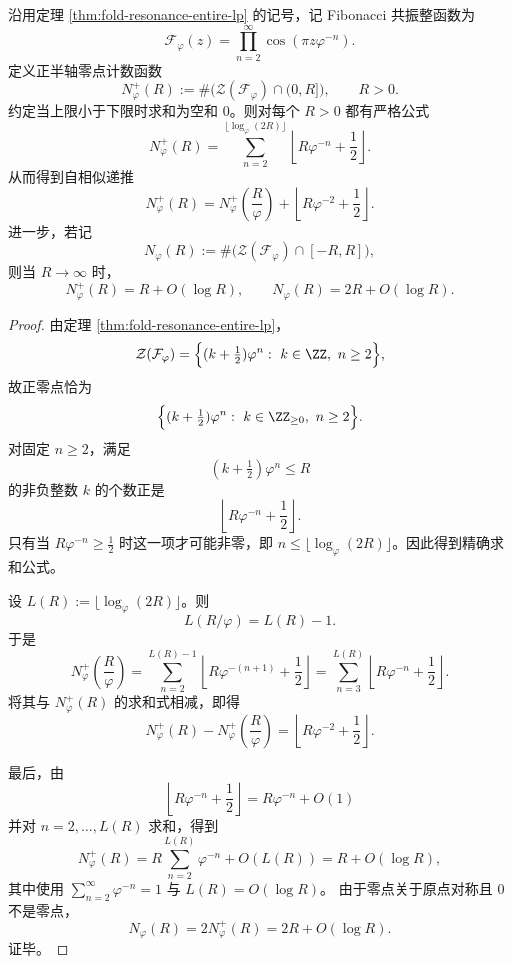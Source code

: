 \begin{theorem}\label{thm:xi-fold-resonance-zero-count-selfsimilar-linear}
沿用定理 \ref{thm:fold-resonance-entire-lp} 的记号，记 Fibonacci 共振整函数为
\[
\mathcal F_\varphi(z)=\prod_{n=2}^{\infty}\cos(\pi z\varphi^{-n}).
\]
定义正半轴零点计数函数
\[
N_\varphi^+(R):=\#\bigl(\mathcal Z(\mathcal F_\varphi)\cap(0,R]\bigr),
\qquad R>0.
\]
约定当上限小于下限时求和为空和 \(0\)。则对每个 \(R>0\) 都有严格公式
\[
\boxed{\;
N_\varphi^+(R)=
\sum_{n=2}^{\lfloor \log_\varphi(2R)\rfloor}
\left\lfloor R\varphi^{-n}+\frac12\right\rfloor.
\;}
\]
从而得到自相似递推
\[
\boxed{\;
N_\varphi^+(R)=N_\varphi^+\!\left(\frac{R}{\varphi}\right)
+\left\lfloor R\varphi^{-2}+\frac12\right\rfloor.
\;}
\]
进一步，若记
\[
N_\varphi(R):=\#\bigl(\mathcal Z(\mathcal F_\varphi)\cap[-R,R]\bigr),
\]
则当 \(R\to\infty\) 时，
\[
\boxed{\;
N_\varphi^+(R)=R+O(\log R),
\qquad
N_\varphi(R)=2R+O(\log R).
\;}
\]
\end{theorem}
\begin{proof}
由定理 \ref{thm:fold-resonance-entire-lp}，
\[
\mathcal Z(\mathcal F_\varphi)=
\Bigl\{(k+\tfrac12)\varphi^n:\ k\in\ZZ,\ n\ge 2\Bigr\},
\]
故正零点恰为
\[
\Bigl\{(k+\tfrac12)\varphi^n:\ k\in\ZZ_{\ge 0},\ n\ge 2\Bigr\}.
\]
对固定 \(n\ge 2\)，满足
\[
(k+\tfrac12)\varphi^n\le R
\]
的非负整数 \(k\) 的个数正是
\[
\left\lfloor R\varphi^{-n}+\frac12\right\rfloor.
\]
只有当 \(R\varphi^{-n}\ge \frac12\) 时这一项才可能非零，即 \(n\le \lfloor\log_\varphi(2R)\rfloor\)。因此得到精确求和公式。

设 \(L(R):=\lfloor\log_\varphi(2R)\rfloor\)。则
\[
L(R/\varphi)=L(R)-1.
\]
于是
\[
N_\varphi^+\!\left(\frac{R}{\varphi}\right)
=
\sum_{n=2}^{L(R)-1}
\left\lfloor R\varphi^{-(n+1)}+\frac12\right\rfloor
=
\sum_{n=3}^{L(R)}
\left\lfloor R\varphi^{-n}+\frac12\right\rfloor.
\]
将其与 \(N_\varphi^+(R)\) 的求和式相减，即得
\[
N_\varphi^+(R)-N_\varphi^+\!\left(\frac{R}{\varphi}\right)
=
\left\lfloor R\varphi^{-2}+\frac12\right\rfloor.
\]

最后，由
\[
\left\lfloor R\varphi^{-n}+\frac12\right\rfloor
=
R\varphi^{-n}+O(1)
\]
并对 \(n=2,\dots,L(R)\) 求和，得到
\[
N_\varphi^+(R)
=
R\sum_{n=2}^{L(R)}\varphi^{-n}+O(L(R))
=
R+O(\log R),
\]
其中使用 \(\sum_{n=2}^{\infty}\varphi^{-n}=1\) 与 \(L(R)=O(\log R)\)。
由于零点关于原点对称且 \(0\) 不是零点，
\[
N_\varphi(R)=2N_\varphi^+(R)=2R+O(\log R).
\]
证毕。
\end{proof}

\endinput
